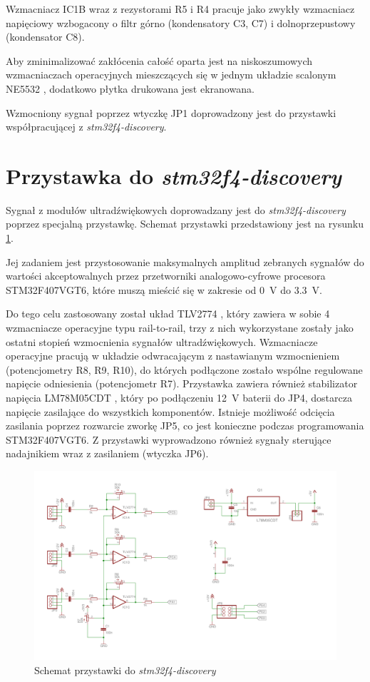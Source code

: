 Wzmacniacz IC1B wraz z rezystorami R5 i R4 pracuje jako zwykły wzmacniacz napięciowy wzbogacony o 
filtr górno (kondensatory C3, C7) i dolnoprzepustowy 
(kondensator C8).

Aby zminimalizować zakłócenia całość oparta jest na niskoszumowych wzmacniaczach operacyjnych
mieszczących się w jednym układzie scalonym NE5532 \cite{bib:ne5532}, 
dodatkowo płytka drukowana jest ekranowana.

Wzmocniony sygnał poprzez wtyczkę JP1 doprowadzony jest do przystawki współpracującej z \textit{stm32f4-discovery}.

\clearpage

\section{Przystawka do \textit{stm32f4-discovery}}

Sygnał z modułów ultradźwiękowych doprowadzany jest do \textit{stm32f4-discovery} poprzez specjalną przystawkę.
Schemat przystawki przedstawiony jest na rysunku \ref{fig:przystawka}.

Jej zadaniem jest przystosowanie maksymalnych amplitud zebranych sygnałów do wartości akceptowalnych przez  
przetworniki analogowo-cyfrowe procesora STM32F407VGT6, które muszą mieścić się w zakresie od \SI{0}{V} do \SI{3,3}{V}.

Do tego celu zastosowany został układ TLV2774 \cite{bib:TLV2774}, który zawiera w sobie 4 wzmacniacze operacyjne typu
rail-to-rail, trzy z nich wykorzystane zostały jako ostatni stopień wzmocnienia sygnałów ultradźwiękowych. 
Wzmacniacze operacyjne pracują w układzie odwracającym z nastawianym wzmocnieniem (potencjometry R8, R9, R10), 
do których podłączone zostało wspólne regulowane napięcie odniesienia (potencjometr R7).
Przystawka zawiera również stabilizator napięcia LM78M05CDT \cite{bib:LM78M05CDT}, który po podłączeniu 
\SI{12}{V} baterii do JP4, dostarcza napięcie zasilające do wszystkich komponentów. 
Istnieje możliwość odcięcia zasilania poprzez rozwarcie zworkę JP5, co jest konieczne podczas programowania
STM32F407VGT6.
Z przystawki wyprowadzono również sygnały sterujące nadajnikiem wraz z zasilaniem (wtyczka JP6).


 \begin{figure}[h!]
    \centering
    \includegraphics[width=1\textwidth, trim= 5mm 0mm 0mm 0mm,clip]{mainboard2}
    \caption{Schemat przystawki do \textit{stm32f4-discovery}}
    \label{fig:przystawka}
\end{figure}


